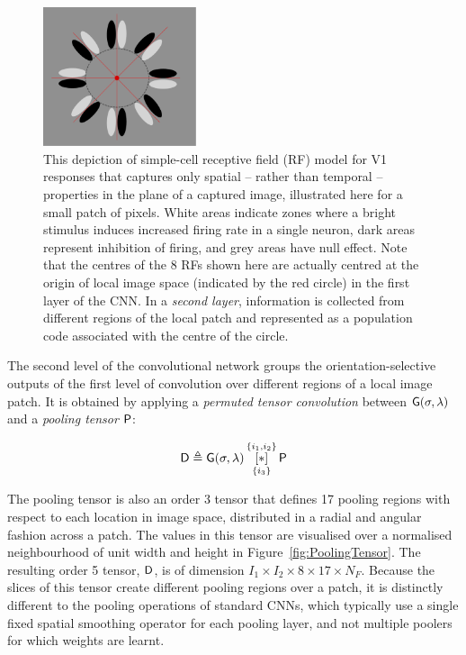 \begin{figure}
\begin{center}
\includegraphics[width=4.5cm]{gfx/Chapter05/OrientedGabors.pdf}
\caption{This depiction of simple\--cell receptive field (RF) model for V1 responses that captures only spatial -- rather than temporal -- properties in the plane of a captured image, illustrated here for a small patch of pixels. White areas indicate zones where a bright stimulus induces increased firing rate in a single neuron, dark areas represent inhibition of firing, and grey areas have null effect.  Note that the centres of the 8 RFs shown here are actually centred at the origin of local image space (indicated by the red circle) in the first layer of the CNN.  In a {\em second layer}, information is collected from different regions of the local patch and represented as a population code associated with the centre of the circle.}
\label{fig:OG}
\end{center}
\end{figure}

The second level of the convolutional network groups the orientation-selective outputs of the first level of convolution over different regions of a local image patch. It is obtained by applying a \textit{permuted tensor convolution} between $\mathsf{G}(\sigma,\lambda)$ and a \textit{pooling tensor} $\mathsf{P}$:  

\begin{equation}
\mathsf{D} \triangleq \mathsf{G}(\sigma,\lambda) \, 
   \underset{\lbrace i_3 \rbrace}{\overset{\lbrace i_1,i_2\rbrace}{[ \ast ]}}\, {\mathsf{P}}
\end{equation}

The pooling tensor is also an order 3 tensor that defines 17 pooling regions with respect to each location in image space, distributed in a radial and angular fashion across a patch. The values in this tensor are visualised over a normalised neighbourhood of unit width and height in Figure~\ref{fig:PoolingTensor}. The resulting order 5 tensor, $\mathsf{D}$, is of dimension $I_1\times I_2 \times 8 \times 17 \times N_F$. Because the slices of this tensor create different pooling regions over a patch, it is distinctly different to the pooling operations of standard CNNs, which typically use a single fixed spatial smoothing operator for each pooling layer, and not multiple poolers for which weights are learnt. 


